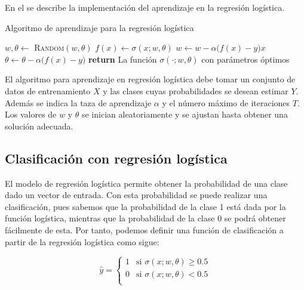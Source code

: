 En el  se describe la implementación del aprendizaje en la regresión logística.


\begin{algorithm}
 \caption{Algoritmo de aprendizaje para la regresión logística}\label{alg:AlgReg}
 \begin{algorithmic}
    \State $w, \theta \leftarrow$ \textsc{Random}$(w, \theta)$
            \State $f(x) \leftarrow \sigma(x; w, \theta) $
            \State $w \leftarrow w - \alpha \big( f(x) - y \big) x $
            \State $\theta \leftarrow \theta - \alpha \big( f(x) - y \big) $
        \EndFor
    \EndFor
    \State \textbf{return} La función $\sigma(\cdot; w, \theta)$ con parámetros óptimos
  \EndFunction
 \end{algorithmic}
\end{algorithm}

El algoritmo para aprendizaje en regresión logística debe tomar un conjunto de datos de entrenamiento $X$ y las clases cuyas probabilidades se desean estimar $Y$. Además se indica la taza de aprendizaje $\alpha$ y el número máximo de iteraciones $T$. Los valores de $w$ y $\theta$ se inician aleatoriamente y se ajustan hasta obtener una solución adecuada.


\subsection{Clasificación con regresión logística}

El modelo de regresión logística permite obtener la probabilidad de una clase dado un vector de entrada. Con esta probabilidad se puede realizar una clasificación, pues sabemos que la probabilidad de la clase 1 está dada por la función logística, mientras que la probabilidad de la clase 0 se podrá obtener fácilmente de esta. Por tanto, podemos definir una función de clasificación a partir de la regresión logística como sigue:

\begin{equation*}
    \hat{y} = \begin{cases} 1 & \text{si } \sigma(x; w, \theta) \geq 0.5 \\
        0 & \text{si } \sigma(x; w, \theta) < 0.5 \\
    \end{cases}
\end{equation*}

